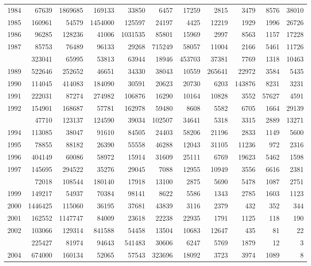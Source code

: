 \documentclass[
]{article}
\begin{document}
\begin{longtable}[t]{lrrrrrrrrrr}
1984 & 67639 & 1869685 & 169133 & 33850 & 6457 & 17259 & 2815 & 3479 & 8576 & 38010\\
1985 & 160961 & 54579 & 1454000 & 125597 & 24197 & 4425 & 12219 & 1929 & 1996 & 26726\\
1986 & 96285 & 128236 & 41006 & 1031535 & 85801 & 15969 & 2997 & 8563 & 1157 & 17228\\
1987 & 85753 & 76489 & 96133 & 29268 & 715249 & 58057 & 11004 & 2166 & 5461 & 11726\\
\addlinespace
1988 & 323041 & 65995 & 53813 & 63944 & 18946 & 453703 & 37381 & 7769 & 1318 & 10463\\
1989 & 522646 & 252652 & 46651 & 34330 & 38043 & 10559 & 265641 & 22972 & 3584 & 5435\\
1990 & 114045 & 414083 & 184090 & 30591 & 20623 & 20730 & 6203 & 143876 & 8231 & 3231\\
1991 & 222031 & 87274 & 274982 & 106876 & 16290 & 10164 & 10828 & 3552 & 57627 & 4591\\
1992 & 154901 & 168687 & 57781 & 162978 & 59480 & 8608 & 5582 & 6705 & 1664 & 29139\\
\addlinespace
1993 & 47710 & 123137 & 124590 & 39034 & 102507 & 34641 & 5318 & 3315 & 2889 & 13271\\
1994 & 113085 & 38047 & 91610 & 84505 & 24403 & 58206 & 21196 & 2833 & 1149 & 5600\\
1995 & 78855 & 88182 & 26390 & 55558 & 46288 & 12043 & 31105 & 11236 & 972 & 2316\\
1996 & 404149 & 60086 & 58972 & 15914 & 31609 & 25111 & 6769 & 19623 & 5462 & 1598\\
1997 & 145695 & 294522 & 35276 & 29045 & 7088 & 12955 & 10949 & 3556 & 6616 & 2381\\
\addlinespace
1998 & 72018 & 108544 & 180140 & 17918 & 13100 & 2875 & 5690 & 5478 & 1087 & 2751\\
1999 & 149217 & 54937 & 70384 & 98141 & 8622 & 5586 & 1343 & 2785 & 1603 & 1123\\
2000 & 1446425 & 115060 & 36195 & 37681 & 43839 & 3116 & 2379 & 432 & 352 & 344\\
2001 & 162552 & 1147747 & 84009 & 23618 & 22238 & 22935 & 1791 & 1125 & 118 & 190\\
2002 & 103066 & 129314 & 841588 & 54458 & 13504 & 10683 & 12647 & 435 & 81 & 22\\
\addlinespace
2003 & 225427 & 81974 & 94643 & 541483 & 30606 & 6247 & 5769 & 1879 & 12 & 3\\
2004 & 674000 & 160134 & 52065 & 57543 & 323696 & 18092 & 3723 & 3974 & 1089 & 8\\

\end{longtable}
\end{document}
